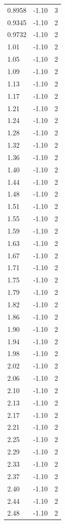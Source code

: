 \begin{longtable}{lrr}
  0.8958 & -1.10 & 3 \\
  0.9345 & -1.10 & 2 \\
  0.9732 & -1.10 & 2 \\
  1.01 & -1.10 & 2 \\
  1.05 & -1.10 & 2 \\
  1.09 & -1.10 & 2 \\
  1.13 & -1.10 & 2 \\
  1.17 & -1.10 & 2 \\
  1.21 & -1.10 & 2 \\
  1.24 & -1.10 & 2 \\
  1.28 & -1.10 & 2 \\
  1.32 & -1.10 & 2 \\
  1.36 & -1.10 & 2 \\
  1.40 & -1.10 & 2 \\
  1.44 & -1.10 & 2 \\
  1.48 & -1.10 & 2 \\
  1.51 & -1.10 & 2 \\
  1.55 & -1.10 & 2 \\
  1.59 & -1.10 & 2 \\
  1.63 & -1.10 & 2 \\
  1.67 & -1.10 & 2 \\
  1.71 & -1.10 & 2 \\
  1.75 & -1.10 & 2 \\
  1.79 & -1.10 & 2 \\
  1.82 & -1.10 & 2 \\
  1.86 & -1.10 & 2 \\
  1.90 & -1.10 & 2 \\
  1.94 & -1.10 & 2 \\
  1.98 & -1.10 & 2 \\
  2.02 & -1.10 & 2 \\
  2.06 & -1.10 & 2 \\
  2.10 & -1.10 & 2 \\
  2.13 & -1.10 & 2 \\
  2.17 & -1.10 & 2 \\
  2.21 & -1.10 & 2 \\
  2.25 & -1.10 & 2 \\
  2.29 & -1.10 & 2 \\
  2.33 & -1.10 & 2 \\
  2.37 & -1.10 & 2 \\
  2.40 & -1.10 & 2 \\
  2.44 & -1.10 & 2 \\
  2.48 & -1.10 & 2 \\

\end{longtable}
